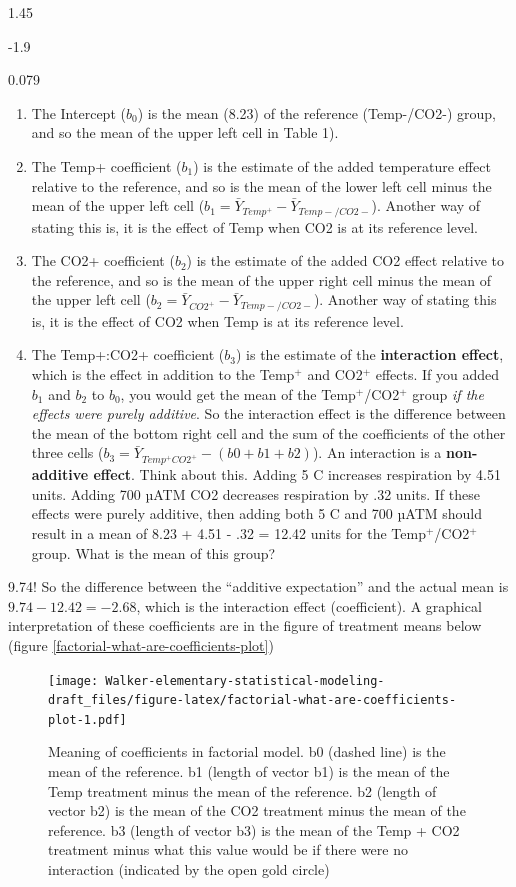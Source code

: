\documentclass[]{book}
\providecommand{\tightlist}{%
  \setlength{\itemsep}{0pt}\setlength{\parskip}{0pt}}
\begin{document}
1.45

-1.9

0.079

\begin{enumerate}
\def\labelenumi{\arabic{enumi}.}
\tightlist
\item
  The Intercept (\(b_0\)) is the mean (8.23) of the reference (Temp-/CO2-) group, and so the mean of the upper left cell in Table 1).
\item
  The Temp+ coefficient (\(b_1\)) is the estimate of the added temperature effect relative to the reference, and so is the mean of the lower left cell minus the mean of the upper left cell (\(b_1=\bar{Y}_{Temp^+}-\bar{Y}_{Temp-/CO2-}\)). Another way of stating this is, it is the effect of Temp when CO2 is at its reference level.
\item
  The CO2+ coefficient (\(b_2\)) is the estimate of the added CO2 effect relative to the reference, and so is the mean of the upper right cell minus the mean of the upper left cell (\(b_2=\bar{Y}_{CO2^+}-\bar{Y}_{Temp-/CO2-}\)). Another way of stating this is, it is the effect of CO2 when Temp is at its reference level.
\item
  The Temp+:CO2+ coefficient (\(b_3\)) is the estimate of the \textbf{interaction effect}, which is the effect in addition to the Temp\(^+\) and CO2\(^+\) effects. If you added \(b_1\) and \(b_2\) to \(b_0\), you would get the mean of the Temp\(^+\)/CO2\(^+\) group \emph{if the effects were purely additive}. So the interaction effect is the difference between the mean of the bottom right cell and the sum of the coefficients of the other three cells (\(b_3 = \bar{Y}_{Temp^+CO2^+} - (b0 + b1 + b2)\)). An interaction is a \textbf{non-additive effect}. Think about this. Adding 5 C increases respiration by 4.51 units. Adding 700 µATM CO2 decreases respiration by .32 units. If these effects were purely additive, then adding both 5 C and 700 µATM should result in a mean of 8.23 + 4.51 - .32 = 12.42 units for the Temp\(^+\)/CO2\(^+\) group. What is the mean of this group?
\end{enumerate}

9.74! So the difference between the ``additive expectation'' and the actual mean is \(9.74 - 12.42 = -2.68\), which is the interaction effect (coefficient). A graphical interpretation of these coefficients are in the figure of treatment means below (figure \ref{factorial-what-are-coefficients-plot})

\begin{figure}
\centering
\texttt{[image: Walker-elementary-statistical-modeling-draft\_files/figure-latex/factorial-what-are-coefficients-plot-1.pdf]}
\caption{\label{fig:factorial-what-are-coefficients-plot}Meaning of coefficients in factorial model. b0 (dashed line) is the mean of the reference. b1 (length of vector b1) is the mean of the Temp treatment minus the mean of the reference. b2 (length of vector b2) is the mean of the CO2 treatment minus the mean of the reference. b3 (length of vector b3) is the mean of the Temp + CO2 treatment minus what this value would be if there were no interaction (indicated by the open gold circle)}
\end{figure}
\end{document}
